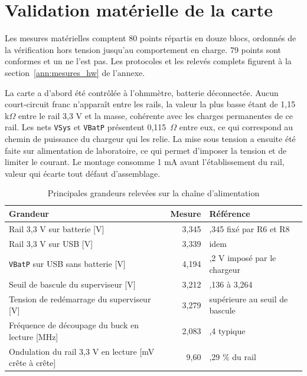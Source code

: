 \section{Validation matérielle de la carte}
\label{sec:res_electrique}

Les mesures matérielles comptent 80 points répartis en douze blocs, ordonnés de la vérification hors tension jusqu'au comportement en charge. 79 points sont conformes et un ne l'est pas. Les protocoles et les relevés complets figurent à la section~\ref{ann:mesures_hw} de l'annexe.

La carte a d'abord été contrôlée à l'ohmmètre, batterie déconnectée. Aucun court-circuit franc n'apparaît entre les rails, la valeur la plus basse étant de 1,15 k$\Omega$ entre le rail 3,3 V et la masse, cohérente avec les charges permanentes de ce rail. Les nets \texttt{VSys} et \texttt{VBatP} présentent 0,115~$\Omega$ entre eux, ce qui correspond au chemin de puissance du chargeur qui les relie. La mise sous tension a ensuite été faite sur alimentation de laboratoire, ce qui permet d'imposer la tension et de limiter le courant. Le montage consomme 1 mA avant l'établissement du rail, valeur qui écarte tout défaut d'assemblage.

\begin{table}[H]
  \centering
  \caption{Principales grandeurs relevées sur la chaîne d'alimentation}
  \label{tab:res_electrique}
  \footnotesize
  \setlength{\tabcolsep}{5pt}
  \begin{tabular}{@{}>{\raggedright\arraybackslash}p{} r >{\raggedright\arraybackslash}p{}@{}}
    \toprule
    \textbf{Grandeur}                                      & \textbf{Mesure} & \textbf{Référence}                                  \\
    \midrule
    Rail 3,3 V sur batterie [V]                            & 3,345           & 3,345 fixé par R6 et R8                             \\
    Rail 3,3 V sur USB [V]                                 & 3,339           & idem                                                \\
    \texttt{VBatP} sur USB sans batterie [V]               & 4,194           & 4,2 V imposé par le chargeur \cite{analog_MAX77757} \\
    Seuil de bascule du superviseur [V]                    & 3,212           & 3,136 à 3,264 \cite{torex_XC6120}                   \\
    Tension de redémarrage du superviseur [V]              & 3,279           & supérieure au seuil de bascule                      \\
    Fréquence de découpage du buck en lecture [MHz]        & 2,083           & 2,4 typique \cite{TI_TPS62A01}                      \\
    Ondulation du rail 3,3 V en lecture [mV crête à crête] & 9,60            & 0,29 \% du rail                                     \\
    \bottomrule
  \end{tabular}
\end{table}

